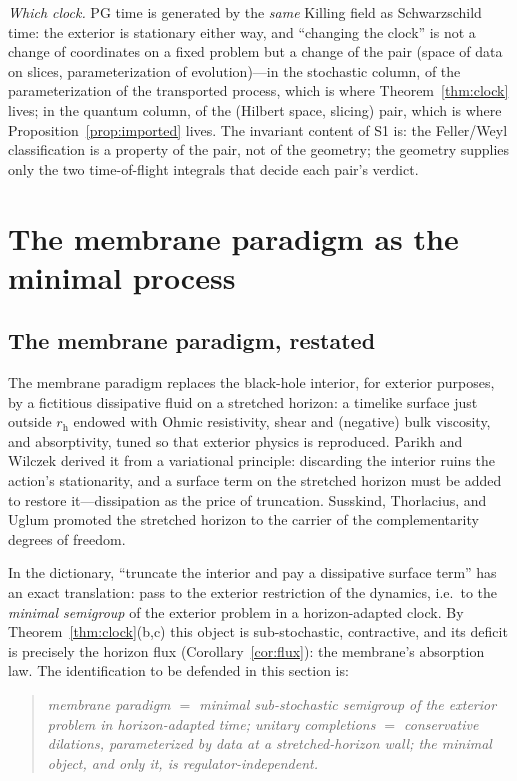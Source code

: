 \documentclass[11pt]{article}
\theoremstyle{definition}
\theoremstyle{remark}
\newcommand{\rh}{r_{\mathrm{h}}}
\begin{document}
\emph{Which clock.} PG time is generated by the \emph{same} Killing
field as Schwarzschild time: the exterior is stationary either way,
and ``changing the clock'' is not a change of coordinates on a fixed
problem but a change of the pair (space of data on slices,
parameterization of evolution)---in the stochastic column, of the
parameterization of the transported process, which is where
Theorem~\ref{thm:clock} lives; in the quantum column, of the
(Hilbert space, slicing) pair, which is where
Proposition~\ref{prop:imported} lives. The invariant content of S1 is:
the Feller/Weyl classification is a property of the pair, not of the
geometry; the geometry supplies only the two time-of-flight integrals
that decide each pair's verdict.

\section{The membrane paradigm as the minimal process}
\label{sec:membrane}

\subsection{The membrane paradigm, restated}

The membrane paradigm
\cite{Damour1978,ThornePriceMacdonald,ParikhWilczek1998} replaces the
black-hole interior, for exterior purposes, by a fictitious
dissipative fluid on a stretched horizon: a timelike surface just
outside $\rh$ endowed with Ohmic resistivity, shear and (negative)
bulk viscosity, and absorptivity, tuned so that exterior physics is
reproduced. Parikh and Wilczek derived it from a variational
principle: discarding the interior ruins the action's stationarity,
and a surface term on the stretched horizon must be added to restore
it---dissipation as the price of truncation. Susskind, Thorlacius,
and Uglum \cite{STU1993} promoted the stretched horizon to the
carrier of the complementarity degrees of freedom.

In the dictionary, ``truncate the interior and pay a dissipative
surface term'' has an exact translation: pass to the exterior
restriction of the dynamics, i.e.\ to the \emph{minimal semigroup} of
the exterior problem in a horizon-adapted clock. By
Theorem~\ref{thm:clock}(b,c) this object is sub-stochastic,
contractive, and its deficit is precisely the horizon flux
(Corollary~\ref{cor:flux}): the membrane's absorption law. The
identification to be defended in this section is:
\begin{quote}
\emph{membrane paradigm $=$ minimal sub-stochastic semigroup of the
exterior problem in horizon-adapted time; unitary completions $=$
conservative dilations, parameterized by data at a stretched-horizon
wall; the minimal object, and only it, is regulator-independent.}
\end{quote}
\end{document}
